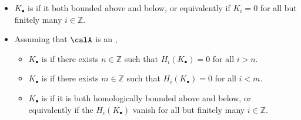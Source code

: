 \begin{definition}
\begin{itemize}
    \item $K_\bullet$ is  if it both bounded above and below, or equivalently if $K_i = 0$ for all but finitely many $i \in \mathbb{Z}$.
    \item Assuming that $\calA$ is an ,
    \begin{itemize}
        \item $K_\bullet$ is  if there exists $n \in \mathbb{Z}$ such that $H_i(K_\bullet) = 0$ for all $i > n$.
        \item $K_\bullet$ is  if there exists $m \in \mathbb{Z}$ such that $H_i(K_\bullet) = 0$ for all $i < m$.

        \item $K_\bullet$ is  if it is both homologically bounded above and below, or equivalently if the  $H_i(K_\bullet)$ vanish for all but finitely many $i \in \mathbb{Z}$.
    \end{itemize}
\end{itemize}
\end{definition}

